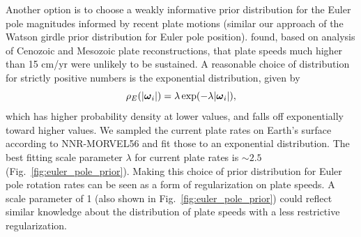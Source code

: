 \documentclass[11pt,letterpaper]{article}
\newcommand{\mitbf}[1]{\hbox{\mathversion{bold}$#1$}}
\begin{document}
Another option is to choose a weakly informative prior distribution for the Euler pole magnitudes informed by recent plate motions (similar our approach of the Watson girdle prior distribution for Euler pole position). \cite{Zahirovic2015a} found, based on analysis of Cenozoic and Mesozoic plate reconstructions, that plate speeds much higher than 15 cm/yr were unlikely to be sustained. A reasonable choice of distribution for strictly positive numbers is the exponential distribution, given by
\begin{equation}
\rho_E(\vert \mitbf{\omega}_i \vert) = \lambda \exp(-\lambda \vert \mitbf{\omega}_i \vert),
\end{equation}
which has higher probability density at lower values, and falls off exponentially toward higher values. We sampled the current plate rates on Earth's surface according to NNR-MORVEL56 and fit those to an exponential distribution. The best fitting scale parameter $\lambda$ for current plate rates is $\sim2.5$ (Fig.~\ref{fig:euler_pole_prior}). Making this choice of prior distribution for Euler pole rotation rates can be seen as a form of regularization on plate speeds. A scale parameter of 1 (also shown in Fig.~\ref{fig:euler_pole_prior}) could reflect similar knowledge about the distribution of plate speeds with a less restrictive regularization.
\end{document}
